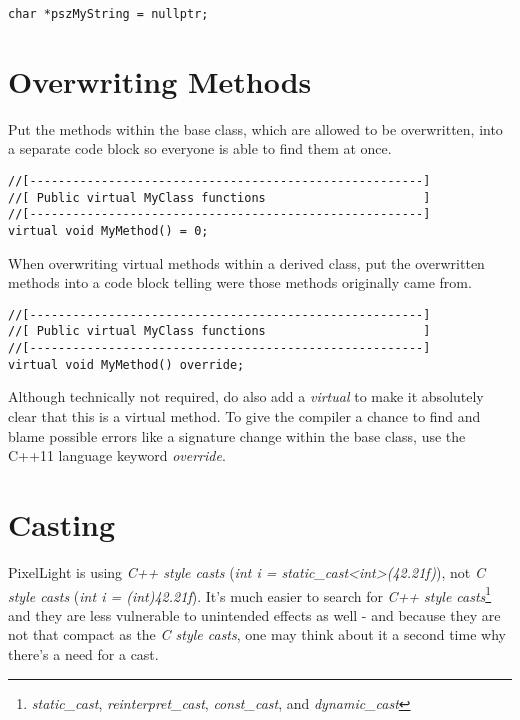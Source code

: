 \begin{lstlisting}[caption=Null pointer]
char *pszMyString = nullptr;
\end{lstlisting}




\section{Overwriting Methods}
Put the methods within the base class, which are allowed to be overwritten, into a separate code block so everyone is able to find them at once.
\begin{lstlisting}[caption=Virtual methods within a base class]
//[-------------------------------------------------------]
//[ Public virtual MyClass functions                      ]
//[-------------------------------------------------------]
virtual void MyMethod() = 0;
\end{lstlisting}

When overwriting virtual methods within a derived class, put the overwritten methods into a code block telling were those methods originally came from.
\begin{lstlisting}[caption=Overwriting virtual methods within a derived class]
//[-------------------------------------------------------]
//[ Public virtual MyClass functions                      ]
//[-------------------------------------------------------]
virtual void MyMethod() override;
\end{lstlisting}
Although technically not required, do also add a \emph{virtual} to make it absolutely clear that this is a virtual method. To give the compiler a chance to find and blame possible errors like a signature change within the base class, use the C++11 language keyword \emph{override}.




\section{Casting}
PixelLight is using \emph{C++ style casts} (\emph{int i = static\_cast<int>(42.21f)}), not \emph{C style casts} (\emph{int i = (int)42.21f}). It's much easier to search for \emph{C++ style casts}\footnote{\emph{static\_cast}, \emph{reinterpret\_cast}, \emph{const\_cast}, and \emph{dynamic\_cast}} and they are less vulnerable to unintended effects as well - and because they are not that compact as the \emph{C style casts}, one may think about it a second time why there's a need for a cast.


